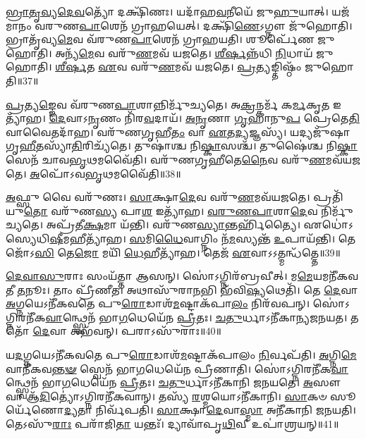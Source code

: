 \-\ul{𑌭𑍍𑌰𑌾}\-\-\ul{𑌤𑍃}\-\-\ul{𑌵𑍍𑌯}\-\-\ul{𑌦𑍇}\-\-\ul{𑌵}\-𑌤𑍍𑌯𑍋᳴ 𑌦𑌕𑍍𑌷𑌿᳴𑌣𑌃।
𑌯𑌦𑌾᳴𑌹\-\ul{𑌵}\-𑌨𑍀𑌯𑍇᳴ 𑌜𑍁\-\ul{𑌹𑍁}\-𑌯𑌾𑌤𑍍।
𑌯𑌜᳴𑌮𑌾𑌨𑌂 𑌵𑌰𑍁𑌣\-\ul{𑌪𑌾}\-𑌶𑍇𑌨᳴ 𑌗𑍍𑌰𑌾𑌹𑌯𑍇𑌤𑍍।
𑌦𑌕𑍍𑌷𑌿᳴\-\ul{𑌣𑍇}\-\-𑌽𑌗𑍍𑌨𑍗 𑌜𑍁᳴𑌹𑍋𑌤𑌿।
𑌭𑍍𑌰𑌾𑌤𑍃᳴𑌵𑍍𑌯\-\ul{𑌮𑍇}\-𑌵 𑌵᳴𑌰𑍁𑌣\-\ul{𑌪𑌾}\-𑌶𑍇𑌨᳴ 𑌗𑍍𑌰𑌾𑌹𑌯𑌤𑌿।
𑌶𑍂𑌰𑍍𑌪𑍇᳴𑌣 𑌜𑍁𑌹𑍋𑌤𑌿।
𑌅𑌨𑍍𑌯᳴\-\ul{𑌮𑍇}\-𑌵 𑌵𑌰𑍁᳴\-\ul{𑌣}\-𑌮𑌵᳴ 𑌯𑌜𑌤𑍇।
\-\ul{𑌶𑍀}\-\-\ul{𑌰𑍍}\-𑌷𑌨𑍍𑌨᳴𑌧𑌿 \ul{𑌨𑌿}\-𑌧𑌾𑌯᳴ 𑌜𑍁𑌹𑍋𑌤𑌿।
\-\ul{𑌶𑍀}\-\-\ul{𑌰𑍍}\-\mbox{}\-\ul{𑌷}\-𑌤 \ul{𑌏}\-𑌵 𑌵𑌰𑍁᳴\-\ul{𑌣}\-𑌮𑌵᳴ 𑌯𑌜𑌤𑍇।
\-\ul{𑌪𑍍𑌰}\-𑌤𑍍𑌯𑌙𑍍𑌤𑌿𑌷𑍍𑌠𑌂᳴ 𑌜𑍁𑌹𑍋𑌤𑌿॥37॥

\-\ul{𑌪𑍍𑌰}\-𑌤𑍍𑌯\-\ul{𑌙𑍍𑌙𑍇}\-𑌵 𑌵᳴𑌰𑍁𑌣\-\ul{𑌪𑌾}\-𑌶𑌾𑌨𑍍𑌨𑌿𑌰𑍍𑌮𑍁᳴𑌚𑍍𑌯𑌤𑍇।
𑌅\-\ul{𑌕𑍍𑌰}\-𑌨𑍍𑌕𑌰𑍍𑌮᳴ 𑌕\-\ul{𑌰𑍍𑌮}\-𑌕𑍃\-\ul{𑌤} 𑌇𑌤𑍍𑌯𑌾᳴𑌹।
\-\ul{𑌦𑍇}\-𑌵𑌾\-𑌽\-\ul{𑌨𑍃}\-𑌣𑌂 𑌨𑌿᳴𑌰\-\ul{𑌵}\-𑌦𑌾𑌯᳴।
\-\ul{𑌅}\-\-\ul{𑌨𑍃}\-𑌣𑌾 \ul{𑌗𑍃}\-𑌹𑌾𑌨𑍁\-\ul{𑌪} 𑌪𑍍𑌰𑍇𑌤𑍇\-\ul{𑌤𑌿} 𑌵𑌾𑌵𑍈𑌤𑌦𑌾᳴𑌹।
𑌵𑌰𑍁᳴𑌣𑌗𑍃𑌹𑍀\-\ul{𑌤𑌂} 𑌵𑌾 \ul{𑌏}\-𑌤\-\ul{𑌦𑍍𑌯}\-𑌜𑍍𑌞𑌸𑍍𑌯᳴।
𑌯𑌦𑍍𑌯𑌜𑍁᳴𑌷𑌾 𑌗𑍃\-\ul{𑌹𑍀}\-𑌤𑌸𑍍𑌯𑌾᳴\-\ul{𑌤𑌿}\-𑌰𑌿𑌚𑍍𑌯᳴𑌤𑍇।
𑌤𑍁𑌷𑌾॑𑌶𑍍𑌚 𑌨𑌿\-\ul{𑌷𑍍𑌕𑌾}\-𑌸𑌶𑍍𑌚᳴।
𑌤𑍁𑌷𑍈॑𑌶𑍍𑌚 𑌨𑌿\-\ul{𑌷𑍍𑌕𑌾}\-𑌸𑍇𑌨᳴ 𑌚𑌾𑌵\-\ul{𑌭𑍃}\-𑌥𑌮𑌵𑍈᳴𑌤𑌿।
𑌵𑌰𑍁᳴𑌣𑌗𑍃𑌹𑍀𑌤𑍇\-\ul{𑌨𑍈}\-𑌵 𑌵𑌰𑍁᳴\-\ul{𑌣}\-𑌮𑌵᳴𑌯𑌜𑌤𑍇।
\-\ul{𑌅}\-𑌪𑍋᳴\-𑌽𑌵\-\ul{𑌭𑍃}\-𑌥𑌮𑌵𑍈᳴𑌤𑌿॥38॥

\-\ul{𑌅}\-𑌫𑍍𑌸𑍁 𑌵𑍈 𑌵𑌰𑍁᳴𑌣𑌃।
\-\ul{𑌸𑌾}\-𑌕𑍍𑌷𑌾\-\ul{𑌦𑍇}\-𑌵 𑌵𑌰𑍁᳴\-\ul{𑌣}\-𑌮𑌵᳴𑌯𑌜𑌤𑍇।
𑌪𑍍𑌰𑌤𑌿᳴\-𑌯𑍁\-\ul{𑌤𑍋} 𑌵𑌰𑍁᳴𑌣\-\ul{𑌸𑍍𑌯} 𑌪𑌾\-\ul{𑌶} 𑌇𑌤𑍍𑌯𑌾᳴𑌹।
\-\ul{𑌵}\-\-\ul{𑌰𑍁}\-\-\ul{𑌣}\-\-\ul{𑌪𑌾}\-𑌶𑌾\-\ul{𑌦𑍇}\-𑌵 𑌨𑌿𑌰𑍍𑌮𑍁᳴𑌚𑍍𑌯𑌤𑍇।
𑌅𑌪𑍍𑌰᳴𑌤𑍀\-\ul{𑌕𑍍𑌷}\-𑌮𑌾 𑌯᳴𑌨𑍍𑌤𑌿।
𑌵𑌰𑍁᳴𑌣\-\ul{𑌸𑍍𑌯𑌾}\-𑌨𑍍𑌤𑌰𑍍\mbox{}𑌹𑌿᳴𑌤𑍍𑌯𑍈।
𑌏𑌧𑍋॑𑌽𑌸𑍍𑌯𑍇𑌧𑌿\-\ul{𑌷𑍀}\-𑌮𑌹𑍀\-𑌤𑍍𑌯𑌾᳴𑌹।
\-\ul{𑌸}\-𑌮𑌿\-\ul{𑌧𑍈}\-𑌵𑌾𑌗𑍍𑌨𑌿𑌂 𑌨᳴\-\ul{𑌮}\-𑌸𑍍𑌯𑌨𑍍𑌤᳴ \ul{𑌉}\-𑌪𑌾𑌯᳴𑌨𑍍𑌤𑌿।
𑌤𑍇𑌜𑍋᳴𑌽\-\ul{𑌸𑌿} 𑌤𑍇\-\ul{𑌜𑍋} 𑌮𑌯𑌿᳴ \ul{𑌧𑍇}\-𑌹𑍀𑌤𑍍𑌯𑌾᳴𑌹।
𑌤𑍇𑌜᳴ \ul{𑌏}\-𑌵𑌾𑌽𑌽𑌤𑍍𑌮𑌨𑍍𑌧᳴𑌤𑍍𑌤𑍇॥39॥

\-\ul{𑌦𑍇}\-\-\ul{𑌵𑌾}\-\-\ul{𑌸𑍁}\-𑌰𑌾𑌃 𑌸𑌂𑌯᳴𑌤𑍍𑌤𑌾 𑌆𑌸𑌨𑍍।
𑌸𑍋॑𑌽𑌗𑍍𑌨𑌿𑌰᳴𑌬𑍍𑌰𑌵𑍀𑌤𑍍।
𑌮\-\ul{𑌮𑍇}\-𑌯𑌮𑌨𑍀᳴𑌕\-𑌵𑌤𑍀 \ul{𑌤}\-𑌨𑍂𑌃।
𑌤𑌾𑌂 𑌪𑍍𑌰𑍀᳴𑌣𑍀𑌤।
𑌅𑌥𑌾𑌸𑍁᳴𑌰𑌾\-\ul{𑌨}\-𑌭𑌿 𑌭᳴𑌵𑌿\-\ul{𑌷𑍍𑌯}\-𑌥𑍇𑌤𑌿᳴।
𑌤𑍇 \ul{𑌦𑍇}\-𑌵𑌾 \ul{𑌅}\-𑌗𑍍𑌨𑌯𑍇\-𑌽𑌨𑍀᳴𑌕𑌵𑌤𑍇 𑌪𑍁\-\ul{𑌰𑍋}\-𑌡𑌾𑌶᳴\-\ul{𑌮}\-𑌷𑍍𑌟𑌾\-𑌕᳴𑌪𑌾\-\ul{𑌲𑌂} 𑌨𑌿𑌰᳴𑌵𑌪𑌨𑍍।
𑌸𑍋॑𑌽𑌗𑍍𑌨𑌿𑌰𑌨𑍀᳴𑌕\-\ul{𑌵𑌾}\-𑌨𑍍𑌥𑍍𑌸𑍍𑌵𑍇𑌨᳴ 𑌭𑌾\-\ul{𑌗}\-𑌧𑍇𑌯𑍇᳴𑌨 \ul{𑌪𑍍𑌰𑍀}\-𑌤𑌃।
\-\ul{𑌚}\-\-\ul{𑌤𑍁}\-𑌰𑍍𑌧𑌾\-𑌽𑌨𑍀᳴𑌕𑌾𑌨𑍍𑌯\-𑌜𑌨𑌯𑌤।
𑌤𑌤𑍋᳴ \ul{𑌦𑍇}\-𑌵𑌾 𑌅𑌭᳴𑌵𑌨𑍍।
𑌪𑌰𑌾𑌽𑌸𑍁᳴𑌰𑌾𑌃॥40॥

𑌯\-\ul{𑌦}\-𑌗𑍍𑌨𑌯𑍇\-𑌽𑌨𑍀᳴𑌕𑌵𑌤𑍇 𑌪𑍁\-\ul{𑌰𑍋}\-𑌡𑌾𑌶᳴\-\ul{𑌮}\-𑌷𑍍𑌟𑌾\-𑌕᳴𑌪𑌾𑌲𑌂 \ul{𑌨𑌿}\-𑌰𑍍𑌵𑌪᳴𑌤𑌿।
\-\ul{𑌅}\-𑌗𑍍𑌨𑌿\-\ul{𑌮𑍇}\-𑌵𑌾\-𑌨𑍀᳴𑌕\-𑌵\-\ul{𑌨𑍍𑌤}\-\-\ul{𑍟} 𑌸𑍍𑌵𑍇𑌨᳴ 𑌭𑌾\-\ul{𑌗}\-𑌧𑍇𑌯𑍇᳴𑌨 𑌪𑍍𑌰𑍀𑌣𑌾𑌤𑌿।
𑌸𑍋॑𑌽𑌗𑍍𑌨𑌿𑌰𑌨𑍀᳴𑌕\-\ul{𑌵𑌾}\-𑌨𑍍𑌥𑍍𑌸𑍍𑌵𑍇𑌨᳴ 𑌭𑌾\-\ul{𑌗}\-𑌧𑍇𑌯𑍇᳴𑌨 \ul{𑌪𑍍𑌰𑍀}\-𑌤𑌃।
\-\ul{𑌚}\-\-\ul{𑌤𑍁}\-𑌰𑍍𑌧𑌾\-𑌽𑌨𑍀᳴𑌕𑌾𑌨𑌿 𑌜𑌨𑌯𑌤𑍇।
\-\ul{𑌅}\-𑌸𑍗 𑌵𑌾 𑌆᳴\-\ul{𑌦𑌿}\-𑌤𑍍𑌯𑍋॑\-𑌽𑌗𑍍𑌨𑌿𑌰𑌨𑍀᳴𑌕𑌵𑌾𑌨𑍍।
𑌤𑌸𑍍𑌯᳴ \ul{𑌰}\-𑌶𑍍𑌮𑌯𑍋\-𑌽𑌨𑍀᳴𑌕𑌾𑌨𑌿।
\-\ul{𑌸𑌾}\-𑌕𑍞 𑌸𑍂𑌰𑍍𑌯𑍇᳴𑌣𑍋\-\ul{𑌦𑍍𑌯}\-𑌤𑌾 𑌨𑌿𑌰𑍍𑌵᳴𑌪𑌤𑌿।
\-\ul{𑌸𑌾}\-𑌕𑍍𑌷𑌾\-\ul{𑌦𑍇}\-𑌵𑌾\-\ul{𑌸𑍍𑌮𑌾} 𑌅𑌨𑍀᳴𑌕𑌾𑌨𑌿 𑌜𑌨𑌯𑌤𑌿।
𑌤𑍇𑌽𑌸𑍁᳴\-\ul{𑌰𑌾𑌃} 𑌪𑌰𑌾᳴𑌜𑌿\-\ul{𑌤𑌾} 𑌯𑌨𑍍𑌤𑌃᳴।
𑌦𑍍𑌯𑌾𑌵𑌾᳴𑌪𑍃\-\ul{𑌥𑌿}\-𑌵𑍀 𑌉𑌪𑌾॑𑌶𑍍𑌰𑌯𑌨𑍍॥41॥

